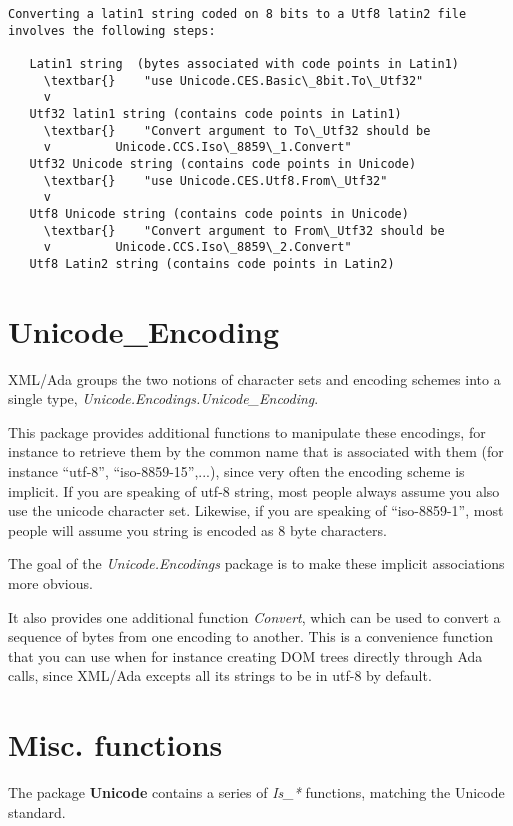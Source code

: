 \documentclass[letterpaper,10pt,english]{sphinxmanual}
\begin{document}
\begin{Verbatim}[commandchars=\\\{\}]
Converting a latin1 string coded on 8 bits to a Utf8 latin2 file
involves the following steps:

   Latin1 string  (bytes associated with code points in Latin1)
     \textbar{}    "use Unicode.CES.Basic\_8bit.To\_Utf32"
     v
   Utf32 latin1 string (contains code points in Latin1)
     \textbar{}    "Convert argument to To\_Utf32 should be
     v         Unicode.CCS.Iso\_8859\_1.Convert"
   Utf32 Unicode string (contains code points in Unicode)
     \textbar{}    "use Unicode.CES.Utf8.From\_Utf32"
     v
   Utf8 Unicode string (contains code points in Unicode)
     \textbar{}    "Convert argument to From\_Utf32 should be
     v         Unicode.CCS.Iso\_8859\_2.Convert"
   Utf8 Latin2 string (contains code points in Latin2)
\end{Verbatim}


\section{Unicode\_Encoding}
\label{unicode:unicode-encoding}
XML/Ada groups the two notions of character sets and encoding schemes into a
single type, \emph{Unicode.Encodings.Unicode\_Encoding}.

This package provides additional functions to manipulate these encodings, for
instance to retrieve them by the common name that is associated with them (for
instance ``utf-8'', ``iso-8859-15'',...), since very often the encoding scheme is
implicit. If you are speaking of utf-8 string, most people always assume you
also use the unicode character set. Likewise, if you are speaking of
``iso-8859-1'', most people will assume you string is encoded as 8 byte
characters.

The goal of the \emph{Unicode.Encodings} package is to make these implicit
associations more obvious.

It also provides one additional function \emph{Convert}, which can be used to
convert a sequence of bytes from one encoding to another. This is a convenience
function that you can use when for instance creating DOM trees directly through
Ada calls, since XML/Ada excepts all its strings to be in utf-8 by default.


\section{Misc. functions}
\label{unicode:misc-functions}
The package \textbf{Unicode} contains a series of \emph{Is\_*} functions, matching the
Unicode standard.
\end{document}
